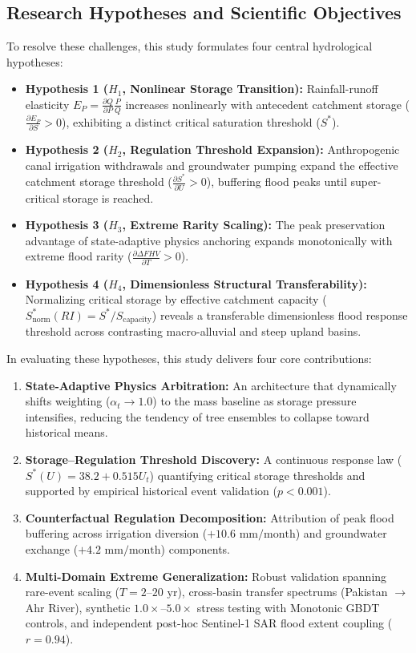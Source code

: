 \documentclass[11pt,a4paper,fleqn]{article}
\begin{document}
\subsection{Research Hypotheses and Scientific Objectives}

To resolve these challenges, this study formulates four central hydrological hypotheses:
\begin{itemize}
    \item \textbf{Hypothesis 1 ($H_1$, Nonlinear Storage Transition):} Rainfall-runoff elasticity $E_P = \frac{\partial Q}{\partial P}\frac{P}{Q}$ increases nonlinearly with antecedent catchment storage ($\frac{\partial E_P}{\partial S} > 0$), exhibiting a distinct critical saturation threshold ($S^*$).
    \item \textbf{Hypothesis 2 ($H_2$, Regulation Threshold Expansion):} Anthropogenic canal irrigation withdrawals and groundwater pumping expand the effective catchment storage threshold ($\frac{\partial S^*}{\partial U} > 0$), buffering flood peaks until super-critical storage is reached.
    \item \textbf{Hypothesis 3 ($H_3$, Extreme Rarity Scaling):} The peak preservation advantage of state-adaptive physics anchoring expands monotonically with extreme flood rarity ($\frac{\partial \Delta FHV}{\partial T} > 0$).
    \item \textbf{Hypothesis 4 ($H_4$, Dimensionless Structural Transferability):} Normalizing critical storage by effective catchment capacity ($S_{\text{norm}}^*(RI) = S^* / S_{\text{capacity}}$) reveals a transferable dimensionless flood response threshold across contrasting macro-alluvial and steep upland basins.
\end{itemize}

\noindent In evaluating these hypotheses, this study delivers four core contributions:
\begin{enumerate}
    \item \textbf{State-Adaptive Physics Arbitration:} An architecture that dynamically shifts weighting ($\alpha_t \to 1.0$) to the mass baseline as storage pressure intensifies, reducing the tendency of tree ensembles to collapse toward historical means.
    \item \textbf{Storage--Regulation Threshold Discovery:} A continuous response law ($S^*(U) = 38.2 + 0.515 U_t$) quantifying critical storage thresholds and supported by empirical historical event validation ($p < 0.001$).
    \item \textbf{Counterfactual Regulation Decomposition:} Attribution of peak flood buffering across irrigation diversion ($+10.6\text{ mm/month}$) and groundwater exchange ($+4.2\text{ mm/month}$) components.
    \item \textbf{Multi-Domain Extreme Generalization:} Robust validation spanning rare-event scaling ($T=2\text{--}20\text{ yr}$), cross-basin transfer spectrums (Pakistan $\to$ Ahr River), synthetic $1.0\times\text{--}5.0\times$ stress testing with Monotonic GBDT controls, and independent post-hoc Sentinel-1 SAR flood extent coupling ($r = 0.94$).
\end{enumerate}
\end{document}
